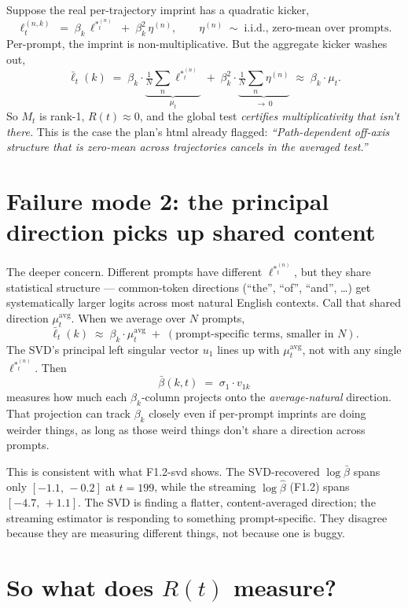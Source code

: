 \documentclass[11pt]{article}
\newcommand{\Rt}{R(t)}
\newcommand{\lstar}{\ell^{*}}
\newcommand{\bhat}{\hat\beta}
\newcommand{\bbar}{\bar\beta}
\begin{document}
Suppose the real per-trajectory imprint has a quadratic kicker,
\[
\ell_t^{(n,k)} \;=\; \beta_k\,\lstar^{(n)}_t \;+\; \beta_k^2\,\eta^{(n)},
\qquad \eta^{(n)} \;\sim\; \text{i.i.d., zero-mean over prompts.}
\]
Per-prompt, the imprint is non-multiplicative.
But the aggregate kicker washes out,
\[
\bar\ell_t(k) \;=\; \beta_k \cdot \underbrace{\tfrac{1}{N}\!\sum_n \lstar^{(n)}_t}_{\mu_t}
\;+\; \beta_k^2 \cdot \underbrace{\tfrac{1}{N}\!\sum_n \eta^{(n)}}_{\to\, 0}
\;\approx\; \beta_k\cdot\mu_t.
\]
So \(M_t\) is rank-1, \(\Rt\approx 0\), and the global test \emph{certifies multiplicativity that isn't there.}
This is the case the plan's html already flagged:
\emph{``Path-dependent off-axis structure that is zero-mean across trajectories cancels in the averaged test.''}

\section{Failure mode 2: the principal direction picks up shared content}

The deeper concern.
Different prompts have different \(\lstar^{(n)}_t\), but they share statistical structure ---
common-token directions (``the'', ``of'', ``and'', \dots) get systematically larger logits across most natural English contexts.
Call that shared direction \(\mu_t^{\text{avg}}\).
When we average over \(N\) prompts,
\[
\bar\ell_t(k) \;\approx\; \beta_k \cdot \mu_t^{\text{avg}} \;+\; (\text{prompt-specific terms, smaller in } N).
\]
The SVD's principal left singular vector \(u_1\) lines up with \(\mu_t^{\text{avg}}\),
not with any single \(\lstar^{(n)}_t\).
Then
\[
\bbar(k,t) \;=\; \sigma_1 \cdot v_{1k}
\]
measures how much each \(\beta_k\)-column projects onto the \emph{average-natural} direction.
That projection can track \(\beta_k\) closely even if per-prompt imprints are doing weirder things,
as long as those weird things don't share a direction across prompts.

This is consistent with what F1.2-svd shows.
The SVD-recovered \(\log\bbar\) spans only \([-1.1,\,-0.2]\) at \(t=199\),
while the streaming \(\log\bhat\) (F1.2) spans \([-4.7,\,+1.1]\).
The SVD is finding a flatter, content-averaged direction;
the streaming estimator is responding to something prompt-specific.
They disagree because they are measuring different things, not because one is buggy.

\section{So what does \(\Rt\) measure?}
\end{document}

